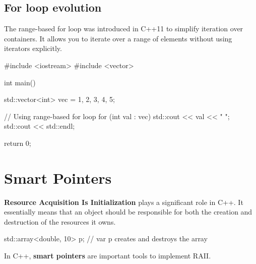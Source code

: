 \subsection*{For loop evolution}

The range-based for loop was introduced in C++11 to simplify iteration over containers. It allows you to iterate over a range of elements without using iterators explicitly.

\begin{exampleblock}
\begin{codeblock}[language=C++]
#include <iostream>
#include <vector>

int main() {
    std::vector<int> vec = {1, 2, 3, 4, 5};

    // Using range-based for loop
    for (int val : vec) {
        std::cout << val << " ";
    }
    std::cout << std::endl;

    return 0;
}
\end{codeblock}
\end{exampleblock}






\newpage
\section{Smart Pointers} \label{sec:smart_pointers}

\begin{definitionblock}[RAII]
    \textbf{Resource Acquisition Is Initialization} plays a significant role in C++. It essentially means that an object should be responsible for both the creation and destruction of the resources it owns.
\end{definitionblock}

\begin{exampleblock}
    \begin{codeblock}[language=C++]
std::array<double, 10> p;  // var p creates and destroys the array
    \end{codeblock}
\end{exampleblock}

In C++, \textbf{smart pointers} are important tools to implement RAII.


